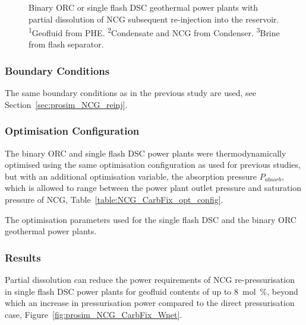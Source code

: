         \begin{figure}[H]
            \centering
            \resizebox{\linewidth}{!}{}
            \caption[Binary \ac{ORC} or single flash \ac{DSC} geothermal power plants with partial dissolution of \ac{NCG} subsequent re-injection into the reservoir.]{Binary \ac{ORC} or single flash \ac{DSC} geothermal power plants with partial dissolution of \ac{NCG} subsequent re-injection into the reservoir. \textsuperscript{1}Geofluid from \ac{PHE}. \textsuperscript{2}Condensate and \ac{NCG} from Condenser. \textsuperscript{3}Brine from flash separator.}
            \label{fig:prosim_NCG_reinjection_CarbFix}
        \end{figure}

    \subsubsection{Boundary Conditions}
        The same boundary conditions as in the previous study are used, see Section~\ref{sec:prosim_NCG_reinj}.

    \subsubsection{Optimisation Configuration}
        The binary \ac{ORC} and single flash \ac{DSC} power plants were thermodynamically optimised using the same optimisation configuration as used for previous studies, but with an additional optimisation variable, the absorption pressure \(P_{absorb}\), which is allowed to range between the power plant outlet pressure and saturation pressure of \ac{NCG}, Table~\ref{table:NCG_CarbFix_opt_config}.

        \begin{table}[H]
            \centering
            \caption{The optimisation parameters used for the single flash \ac{DSC} and the binary \ac{ORC} geothermal power plants.}
            \label{table:NCG_CarbFix_opt_config}
                    
        \end{table}

    \subsubsection{Results}
        Partial dissolution can reduce the power requirements of \ac{NCG} re-pressurisation in single flash \ac{DSC} power plants for geofluid  contents of up to \qty{8}{\mol\percent}, beyond which an increase in pressurisation power compared to the direct pressurisation case, Figure~\ref{fig:prosim_NCG_CarbFix_Wnet}. 

